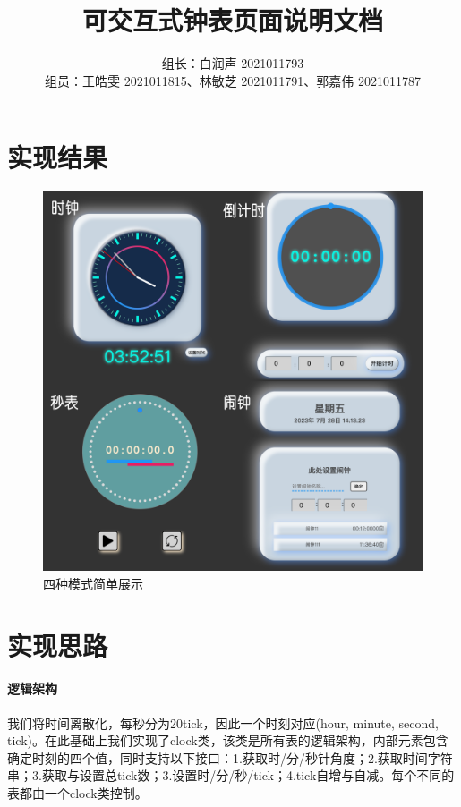 \documentclass[UTF8]{ctexart}
\title{\heiti \zihao {-2} 可交互式钟表页面说明文档}
\author{组长：白润声 2021011793 \\ 组员：王皓雯 2021011815、林敏芝 2021011791、郭嘉伟 2021011787}
\date{}
\begin{document}
	\maketitle
	\section{实现结果}
	
	\begin{figure}[!htb]
		\centering
		\includegraphics[width=\linewidth]{总体展示图.png}
		\caption{四种模式简单展示}
	\end{figure}
	
	\section{实现思路} %
	\paragraph{逻辑架构}
	 我们将时间离散化，每秒分为20tick，因此一个时刻对应(hour, minute, second, tick)。在此基础上我们实现了clock类，该类是所有表的逻辑架构，内部元素包含确定时刻的四个值，同时支持以下接口：1.获取时/分/秒针角度；2.获取时间字符串；3.获取与设置总tick数；3.设置时/分/秒/tick；4.tick自增与自减。每个不同的表都由一个clock类控制。
\end{document}
